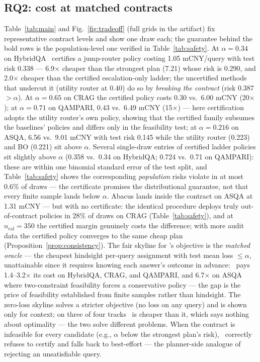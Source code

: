 \subsection{RQ2: cost at matched contracts}
\label{sec:exp-cost}

Table~\ref{tab:main} and Fig.~\ref{fig:tradeoff} (full grids in the
artifact) fix representative contract levels and show one draw each; the
guarantee behind the bold rows is the population-level one verified in
Table~\ref{tab:safety}. At $\alpha=0.34$ on HybridQA \system\ certifies a
jump-router policy costing 1.05 mCNY/query with test risk 0.338 ---
6.9$\times$ cheaper than the strongest plan (7.21) whose risk is 0.290,
and 2.0$\times$ cheaper than the certified escalation-only ladder; the
uncertified methods that undercut it (utility router at 0.40) do so by
\emph{breaking the contract} (risk 0.387~$>\alpha$). At
$\alpha=0.65$ on CRAG the certified policy costs 0.30 vs.\ 6.00 mCNY
(20$\times$); at $\alpha=0.71$ on QAMPARI, 0.43 vs.\ 6.49 mCNY
(15$\times$) --- here certification adopts the utility router's own
policy, showing that the certified family subsumes the baselines'
policies and differs only in the feasibility test; at $\alpha=0.216$ on
ASQA, 6.56 vs.\ 9.01 mCNY with test risk 0.145 while the utility router
(0.223) and BO (0.221) sit above $\alpha$. Several single-draw entries
of certified ladder policies sit slightly above $\alpha$ (0.358 vs.\
0.34 on HybridQA; 0.724 vs.\ 0.71 on QAMPARI): these are within one
binomial standard error of the test split, and Table~\ref{tab:safety}
shows the corresponding \emph{population} risks violate in at most
0.6\% of draws --- the certificate promises the distributional
guarantee, not that every finite sample lands below $\alpha$. Abacus
lands inside the contract on
ASQA at 1.31 mCNY --- but with no certificate: the identical procedure
deploys truly out-of-contract policies in 28\% of draws on CRAG
(Table~\ref{tab:safety}), and at
$n_{\mathrm{cal}}=350$ the certified margin genuinely costs the
difference; with more audit data the certified policy converges to the
same cheap plan (Proposition~\ref{prop:consistency}). The fair skyline
for \system's objective is the \emph{matched oracle} --- the cheapest
hindsight per-query assignment with test mean loss $\le\alpha$,
unattainable since it requires knowing each answer's outcome in
advance: \system\ pays 1.4--3.2$\times$ its cost on HybridQA, CRAG, and
QAMPARI, and 6.7$\times$ on ASQA where two-constraint feasibility
forces a conservative policy --- the gap is the price of feasibility
established from finite samples rather than hindsight. The zero-loss
skyline solves a stricter objective (no loss on any query) and is shown
only for context; on three of four tracks \system\ is cheaper than it,
which says nothing about optimality --- the two solve different
problems. When the contract is infeasible for every candidate (e.g.,
$\alpha$ below the strongest plan's risk), \system\ correctly refuses to
certify and falls back to best-effort --- the planner-side analogue of
rejecting an unsatisfiable query.

